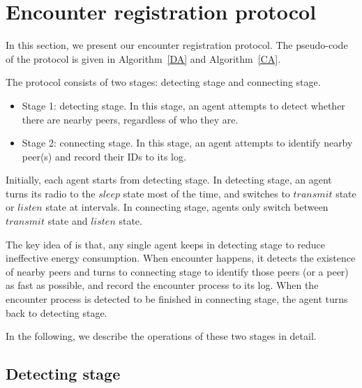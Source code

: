 \section{Encounter registration protocol}

\label{sectionprotocol}

In this section, we present our encounter registration protocol.
The pseudo-code of the protocol is given in Algorithm~\ref{DA} and Algorithm~\ref{CA}.

The protocol consists of two stages: detecting stage and connecting stage. 
\begin{itemize}
    \item Stage 1: detecting stage. In this stage, an agent attempts to
    detect whether there are nearby peers, regardless of who they are. 
    \item Stage 2: connecting stage. In this stage, an agent attempts to 
    identify nearby peer(s) and record their IDs to its log.
\end{itemize}

Initially, each agent starts from detecting stage. 
In detecting stage, an agent turns its radio to the $sleep$ state most of the time,
and switches to $transmit$ state or $listen$ state at intervals.
In connecting stage, agents only switch between $transmit$ state 
and $listen$ state.

The key idea of {\pName} is that, any single agent keeps in detecting 
stage to reduce ineffective energy consumption. When encounter happens, 
it detects the existence of nearby peers and turns to connecting stage 
to identify those peers (or a peer) as fast as possible, and record the encounter process to its log. 
When the encounter process is detected to be finished in connecting stage, 
the agent turns back to detecting stage.


In the following, we describe the operations of these two stages in detail. 

\subsection{Detecting stage}

